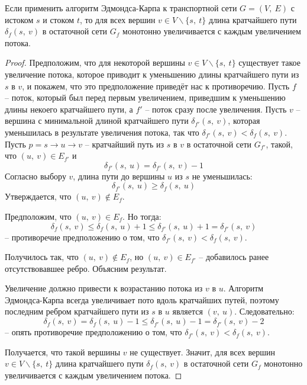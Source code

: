 \documentclass[a4paper,12pt]{article}
\begin{document}
\begin{fulllemma}
Если применить алгоритм Эдмондса-Карпа к транспортной сети $G = (V,\ E)$ с истоком $s$ и стоком $t$, то для всех вершин $v \in V\backslash\{s,\ t\}$ длина кратчайшего пути $\delta_f(s,\ v)$ в остаточной сети $G_f$ монотонно увеличивается с каждым увеличением потока.
\end{fulllemma}
\begin{proof}
Предположим, что для некоторой вершины $v \in V\backslash\{s,\ t\}$ существует такое увеличение потока, которое приводит к уменьшению длины кратчайшего пути из $s$ в $v$, и покажем, что это предположение приведёт нас к противоречию. Пусть $f$ -- поток, который был перед первым увеличением, приведшим к уменьшению длины некоего кратчайшего пути, а $f'$ -- поток сразу после увеличения. Пусть $v$ -- вершина с минимальной длиной кратчайшего пути $\delta_{f'}(s,\ v)$, которая уменьшилась в результате увеличения потока, так что $\delta_{f'}(s,\ v) < \delta_f(s,\ v)$. Пусть $p = s \to u \to v$ -- кратчайший путь из $s$ в $v$ в остаточной сети $G_{f'}$, такой, что $(u,\ v) \in E_{f'}$  и \[\delta_{f'}(s,\ u) = \delta_{f'}(s,\ v) - 1\]
Согласно выбору $v$, длина пути до вершины $u$ из $s$ не уменьшилась:\[\delta_{f'}(s,\ u) \geqslant \delta_{f}(s,\ u)\]
Утверждается, что $(u,\ v) \notin E_f$.

Предположим, что $(u,\ v) \in E_f$. Но тогда: \[\delta_{f}(s,\ v) \leqslant \delta_{f}(s,\ u) + 1 \leqslant \delta_{f'}(s,\ u) + 1 = \delta_{f'}(s,\ v)\] -- противоречие предположению о том, что $\delta_{f'}(s,\ v) < \delta_f(s,\ v)$.

Получилось так, что $(u,\ v) \notin E_f$, но $(u,\ v) \in E_{f'}$ -- добавилось ранее отсутствовавшее ребро. Объясним результат.

Увеличение должно привести к возрастанию потока из $v$ в $u$. Алгоритм Эдмондса-Карпа всегда увеличивает пото вдоль кратчайших путей, поэтому последним ребром кратчайшего пути из $s$ в $u$ является $(v,\ u)$. Следовательно: \[\delta_{f}(s,\ v) = \delta_{f}(s,\ u) - 1 \leqslant \delta_{f'}(s,\ u) - 1 = \delta_{f'}(s,\ v) - 2\] -- опять противоречие предположению о том, что $\delta_{f'}(s,\ v) < \delta_f(s,\ v)$.

Получается, что такой вершины $v$ не существует. Значит, для всех вершин $v \in V\backslash\{s,\ t\}$ длина кратчайшего пути $\delta_f(s,\ v)$ в остаточной сети $G_f$ монотонно увеличивается с каждым увеличением потока.
\end{proof}
\end{document}
